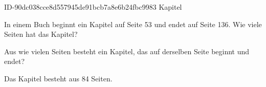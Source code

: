 \begin{exercise}
      {ID-90dc038cce8d557945de91bcb7a8e6b24fbc9983}
      {Kapitel}
  \ifproblem\problem\par
    In einem Buch beginnt ein Kapitel auf Seite \num{53} und endet auf Seite \num{136}.
    Wie viele Seiten hat das Kapitel?
  \fi
  \ifoutline\outline\par
    Aus wie vielen Seiten besteht ein Kapitel, das auf derselben Seite beginnt und endet?
  \fi
  \ifoutcome\outcome\par
    Das Kapitel besteht aus \num{84} Seiten.
  \fi
\end{exercise}
